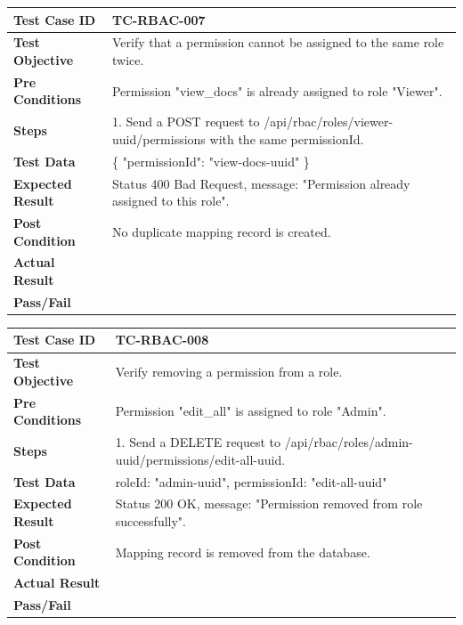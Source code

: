 \begin{longtable}{|p{}|p{}|}
\hline
\textbf{Test Case ID} & TC-RBAC-007 \\ \hline
\textbf{Test Objective} & Verify that a permission cannot be assigned to the same role twice. \\ \hline
\textbf{Pre Conditions} & Permission "view_docs" is already assigned to role "Viewer". \\ \hline
\textbf{Steps} & 
1. Send a POST request to /api/rbac/roles/viewer-uuid/permissions with the same permissionId. \\ \hline
\textbf{Test Data} & \{ "permissionId": "view-docs-uuid" \} \\ \hline
\textbf{Expected Result} & Status 400 Bad Request, message: "Permission already assigned to this role". \\ \hline
\textbf{Post Condition} & No duplicate mapping record is created. \\ \hline
\textbf{Actual Result} &  \\ \hline
\textbf{Pass/Fail} &  \\ \hline
\end{longtable}

\begin{longtable}{|p{}|p{}|}
\hline
\textbf{Test Case ID} & TC-RBAC-008 \\ \hline
\textbf{Test Objective} & Verify removing a permission from a role. \\ \hline
\textbf{Pre Conditions} & Permission "edit_all" is assigned to role "Admin". \\ \hline
\textbf{Steps} & 
1. Send a DELETE request to /api/rbac/roles/admin-uuid/permissions/edit-all-uuid. \\ \hline
\textbf{Test Data} & roleId: "admin-uuid", permissionId: "edit-all-uuid" \\ \hline
\textbf{Expected Result} & Status 200 OK, message: "Permission removed from role successfully". \\ \hline
\textbf{Post Condition} & Mapping record is removed from the database. \\ \hline
\textbf{Actual Result} &  \\ \hline
\textbf{Pass/Fail} &  \\ \hline
\end{longtable}

